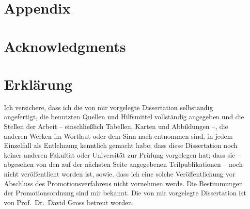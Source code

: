 \documentclass[
  a4paper,
  11pt,
  BCOR=8mm,
  twoside,
  headsepline]{scrbook}
\begin{document}
\tableofcontents

\mainmatter









\appendix

\chapter{Appendix}%





\printbibliography[heading=bibintoc]


\chapter*{Acknowledgments}

\chapter*{Erklärung}

Ich versichere, dass ich die von mir vorgelegte Dissertation selbständig angefertigt, die benutzten Quellen und Hilfsmittel vollständig angegeben und die Stellen der Arbeit -- einschließlich Tabellen, Karten und Abbildungen --, die anderen Werken im Wortlaut oder dem Sinn nach entnommen sind, in jedem Einzelfall als Entlehnung kenntlich gemacht habe; dass diese Dissertation noch keiner anderen Fakultät oder Universität zur Prüfung vorgelegen hat; dass sie -- abgesehen von den auf der nächsten Seite angegebenen Teilpublikationen -- noch nicht veröffentlicht worden ist, sowie, dass ich eine solche Veröffentlichung vor Abschluss des Promotionsverfahrens nicht vornehmen werde.
Die Bestimmungen der Promotionsordnung sind mir bekannt.
Die von mir vorgelegte Dissertation ist von Prof.\ Dr.\ David Gross betreut worden.
\end{document}
